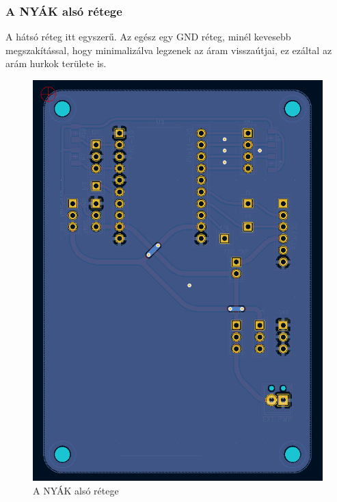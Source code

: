 \documentclass[a4paper,12pt,oneside]{book}
\begin{document}
\subsubsection{A NYÁK alsó rétege}
A hátsó réteg itt egyszerű. Az egész egy GND réteg, minél kevesebb megszakítással, hogy minimalizálva legzenek az áram visszaútjai, ez ezáltal az arám hurkok területe is.
\begin{figure}[H]
	\centering
	\includegraphics[trim=1mm 1mm 1mm 1mm,scale=0.45]{also reteg.PNG}
	\caption{A NYÁK alsó rétege}
	\label{A NYÁK alsó rétege}
\end{figure}
\end{document}
